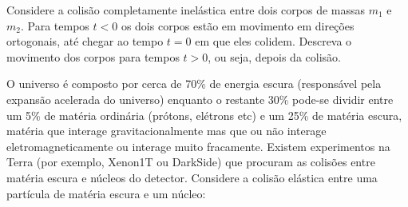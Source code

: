 \documentclass[]{IMTexam}
\author{Isabella B.}
\date{}
\begin{document}
\maketitle

\begin{questions}

	\question Considere a colisão completamente inelástica entre dois corpos de massas $ m_1 $ e $ m_2 $. Para tempos $ t < 0 $ os dois corpos estão em movimento em direções ortogonais, até chegar ao tempo $ t = 0 $ em que eles colidem. Descreva o movimento dos corpos para tempos $ t > 0 $, ou seja, depois da colisão.

	\begin{solution}

	\end{solution}

	\question O universo é composto por cerca de 70\% de energia escura (responsável pela expansão acelerada do universo) enquanto o restante 30\% pode-se dividir entre um 5\% de matéria ordinária (prótons, elétrons etc) e um 25\% de matéria escura, matéria que interage gravitacionalmente mas que ou não interage eletromagneticamente ou interage muito fracamente. Existem experimentos na Terra (por exemplo, Xenon1T ou DarkSide) que procuram as colisões entre matéria escura e núcleos do detector. Considere a colisão elástica entre uma partícula de matéria escura e um núcleo:

\end{questions}
\end{document}
